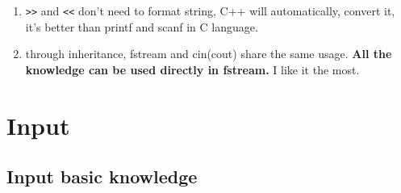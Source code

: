 \documentclass[a4paper,11pt,twoside]{book}
\begin{document}
\begin{itemize}
\begin{enumerate}
		\item \verb=>>= and \verb=<<= don't need to format string,  C++ will automatically,  convert it, it's better than printf and scanf in C language.
		
		\item through inheritance, fstream and cin(cout) share the same usage. \textbf{All the knowledge can be used directly in fstream.} I like it the most.
	\end{enumerate}
	
\end{itemize}



\section{Input}

\subsection{Input basic knowledge}
\end{document}
